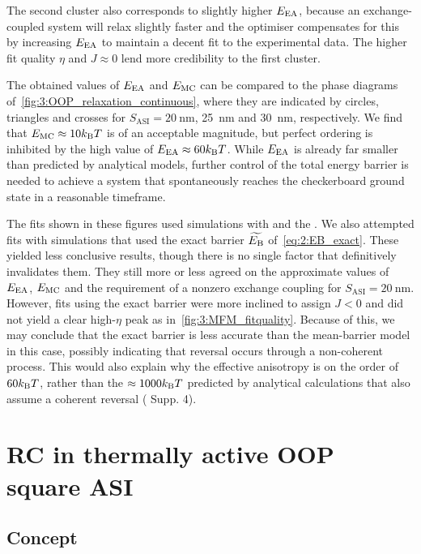 The second cluster also corresponds to slightly higher $E_\mathrm{EA}$, because an exchange-coupled system will relax slightly faster and the optimiser compensates for this by increasing $E_\mathrm{EA}$ to maintain a decent fit to the experimental data.
The higher fit quality $\eta$ and $J \approx 0$ lend more credibility to the first cluster. \\\par

The obtained values of $E_\mathrm{EA}$ and $E_\mathrm{MC}$ can be compared to the phase diagrams of~\cref{fig:3:OOP_relaxation_continuous}, where they are indicated by circles, triangles and crosses for $S_\mathrm{ASI} = \SI{20}{\nano\metre}$, \SI{25}{\nano\metre} and \SI{30}{\nano\metre}, respectively.
We find that $\EMC \approx 10 \kBT$ is of an acceptable magnitude, but perfect ordering is inhibited by the high value of $\EEA \approx 60 \kBT$.
While $E_\mathrm{EA}$ is already far smaller than predicted by analytical models, further control of the total energy barrier is needed to achieve a system that spontaneously reaches the checkerboard ground state in a reasonable timeframe. \\\par

The fits shown in these figures used \hotspice simulations with  and the .
We also attempted fits with simulations that used the exact barrier $\widetilde{E_\mathrm{B}}$ of~\cref{eq:2:EB_exact}.
These yielded less conclusive results, though there is no single factor that definitively invalidates them.
They still more or less agreed on the approximate values of $E_\mathrm{EA}$, $E_\mathrm{MC}$ and the requirement of a nonzero exchange coupling for $S_\mathrm{ASI} = \SI{20}{\nano\metre}$.
However, fits using the exact barrier were more inclined to assign $J < 0$ and did not yield a clear high-$\eta$ peak as in~\cref{fig:3:MFM_fitquality}.
Because of this, we may conclude that the exact barrier is less accurate than the mean-barrier model in this case, possibly indicating that reversal occurs through a non-coherent process.
This would also explain why the effective anisotropy is on the order of $60 \kBT$, rather than the $\approx 1000 \kBT$ predicted by analytical calculations that also assume a coherent reversal ( Supp. 4).

\newpage
\section{RC in thermally active OOP square ASI}
\subsection{Concept}
